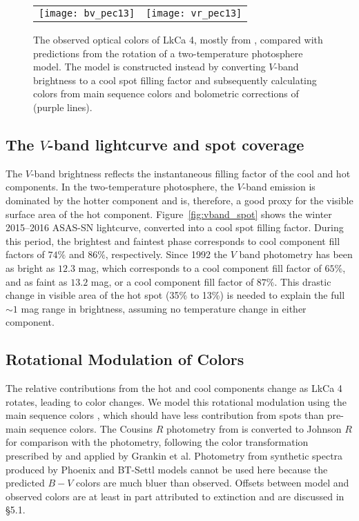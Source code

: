 \documentclass[twocolumn]{emulateapj}%
\begin{document}
\begin{figure*}
 \centering
 \begin{tabular}{ll}
 \texttt{[image: bv\_pec13]} 
    &
   \texttt{[image: vr\_pec13]}
    \end{tabular}
\caption{The observed optical colors of LkCa 4, mostly from \citet{grankin08}, compared with predictions from the rotation of a two-temperature photosphere model.  The model is constructed instead by converting $V$-band brightness to a cool spot filling factor and subsequently calculating colors from main sequence colors and bolometric corrections of \citet{pecaut13} (purple lines).}
\label{fig:colors}
\end{figure*}


\subsection{The $V$-band lightcurve and spot coverage}\label{sec:rotSpot1}

The  $V$-band brightness reflects the instantaneous filling factor of the cool and hot components.  In the two-temperature photosphere, the $V$-band emission is dominated by the hotter component and is, therefore, a good proxy for the visible surface area of the hot component.  Figure~\ref{fig:vband_spot} shows the winter 2015--2016 ASAS-SN lightcurve, converted into a cool spot filling factor.  During this period, the brightest and faintest phase corresponds to cool component fill factors of $74\%$ and $86\%$, respectively.  Since 1992 the $V$ band photometry has been as bright as $12.3$ mag, which corresponds to a cool component fill factor of $65\%$, and as faint as $13.2$ mag, or a cool component fill factor of $87\%$.  This drastic change in visible area of the hot spot (35\% to 13\%) is needed to explain the full $\sim 1$ mag range in brightness, assuming no temperature change in either component.


\subsection{Rotational Modulation of Colors}\label{sec:rotSpot}

The relative contributions from the hot and cool components change as LkCa 4 rotates, leading to color changes.  We model this rotational modulation using the main sequence colors \citep[compiled by][]{pecaut13}, which should have less contribution from spots than pre-main sequence colors.  The Cousins $R$ photometry from \citet{pecaut13} is converted to Johnson $R$ for comparison with the \citet{grankin08} photometry, following the color transformation prescribed by \citet{landolt83} and applied by Grankin et al.  Photometry from synthetic spectra produced by Phoenix and BT-Settl models cannot be used here because the predicted $B-V$ colors are much bluer than observed.  Offsets between model and observed colors are at least in part attributed to extinction and are discussed in \S 5.1.  
\end{document}
